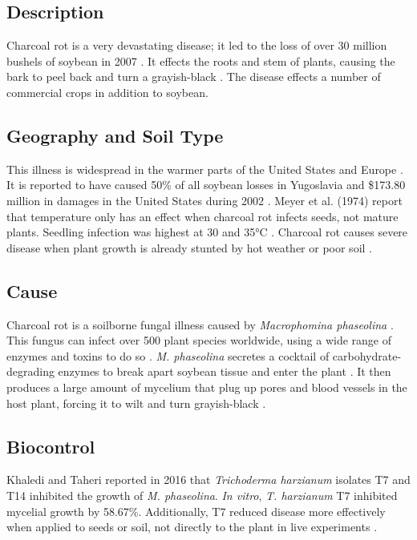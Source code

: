 \documentclass[letterpaper, 12pt]{report}
\begin{document}
\subsection{Description}

Charcoal rot is a very devastating disease; it led to the loss of over 30 million bushels of soybean in 2007 \autocite{wrather2009effects}. It effects the roots and stem of plants, causing the bark to peel back and turn a grayish-black \autocite{dunleavy1966soybean}. The disease effects a number of commercial crops in addition to soybean.

\subsection{Geography and Soil Type}

This illness is widespread in the warmer parts of the United States and Europe \autocite{dunleavy1966soybean}. It is reported to have caused 50\% of all soybean losses in Yugoslavia \autocite{acimovic1963sclerotium} and \$173.80 million in damages in the United States during 2002 \autocite{islam2012tools}. Meyer et al. (1974) report that temperature only has an effect when charcoal rot infects seeds, not mature plants. Seedling infection was highest at 30 and 35°C \autocite{meyer1974factors}. Charcoal rot causes severe disease when plant growth is already stunted by hot weather or poor soil \autocite{dunleavy1966soybean}.

\subsection{Cause}

Charcoal rot is a soilborne fungal illness caused by \emph{Macrophomina phaseolina} \autocite{dunleavy1966soybean}. This fungus can infect over 500 plant species worldwide, using a wide range of enzymes and toxins to do so \autocite{islam2012tools}. \emph{M. phaseolina} secretes a cocktail of carbohydrate-degrading enzymes to break apart soybean tissue and enter the plant \autocite{islam2012tools}. It then produces a large amount of mycelium that plug up pores and blood vessels in the host plant, forcing it to wilt and turn grayish-black \autocite{islam2012tools}.

\subsection{Biocontrol}

Khaledi and Taheri reported in 2016 that \emph{Trichoderma harzianum} isolates T7 and T14 inhibited the growth of \emph{M. phaseolina}. \emph{In vitro}, \emph{T. harzianum} T7 inhibited mycelial growth by 58.67\%. Additionally, T7 reduced disease more effectively when applied to seeds or soil, not directly to the plant in live experiments \autocite{khaledi2016biocontrol}.
\end{document}
